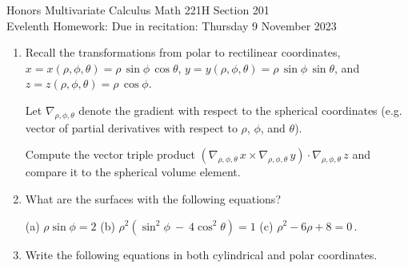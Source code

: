 \documentclass[12pt]{article}
\begin{document}
\LARGE 
\noindent
{\color{Maroon}Honors Multivariate Calculus \hfill Math 221H Section 201}\vspace{2pt}\\
\large
Evelenth Homework:\hfill 
Due in recitation: Thursday 9 November 2023\vspace{2pt}

\normalsize
    \vspace{2pt}

\begin{enumerate}



\item Recall the transformations from polar to rectilinear coordinates,
  $x=x(\rho,\phi,\theta)=\rho\, \sin\phi\, \cos\theta$, \newline
  $y=y(\rho,\phi,\theta)=\rho\, \sin\phi\, \sin\theta$, and 
  $z=z(\rho,\phi,\theta)=\rho\, \cos\phi$.

  Let $\nabla_{\rho,\phi,\theta}$ denote the gradient with respect to the spherical coordinates (e.g. vector of partial derivatives with
  respect to $\rho$, $\phi$, and $\theta$).

  Compute the vector triple product
  $(\nabla_{\rho,\phi,\theta}\,x \times \nabla_{\rho,\phi,\theta}\, y ) \cdot \nabla_{\rho,\phi,\theta}\, z$
  and compare it to the spherical volume element.
  
\vspace{-2pt}
   
   
\item What are the surfaces with the following equations?

  (a) $\rho\sin\phi = 2$ \qquad
  (b) $\rho^2(\sin^2\phi\ -\ 4\cos^2\theta) = 1$ \qquad
  (c) $\rho^2-6\rho + 8=0$\,.
\vspace{-2pt}

   
\item Write the following equations in both cylindrical and polar coordinates.


\end{enumerate}
\end{document}
